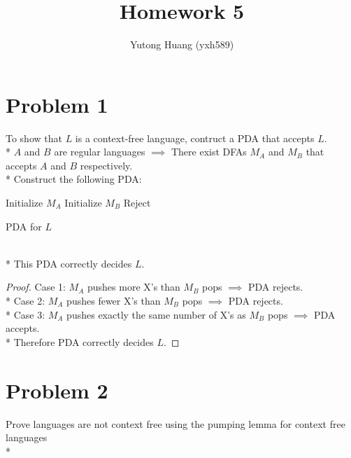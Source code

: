 \documentclass{article}
\title{\vspace{-3cm}Homework 5}
\author{Yutong Huang (yxh589)}
\date{}
\begin{document}
\maketitle
\section*{Problem 1}
To show that $L$ is a context-free language, contruct a PDA that accepts $L$.\\*
$A$ and $B$ are regular languages $\implies$ There exist DFAs $M_A$ and $M_B$ that accepts $A$ and $B$ respectively.\\*
Construct the following PDA:
\begin{algorithm}
    \DontPrintSemicolon
    Initialize $M_A$\;
    Initialize $M_B$\;
    Reject\;
    \caption{PDA for $L$}
\end{algorithm}\\*
This PDA correctly decides $L$.
\begin{proof}
    Case 1: $M_A$ pushes more X's than $M_B$ pops $\implies$ PDA rejects.\\*
    Case 2: $M_A$ pushes fewer X's than $M_B$ pops $\implies$ PDA rejects.\\*
    Case 3: $M_A$ pushes exactly the same number of X's as $M_B$ pops
    $\implies$ PDA accepts.\\*
    Therefore PDA correctly decides $L$.
\end{proof}

\section*{Problem 2}
Prove languages are not context free using the pumping lemma for context free languages\\*
\end{document}
